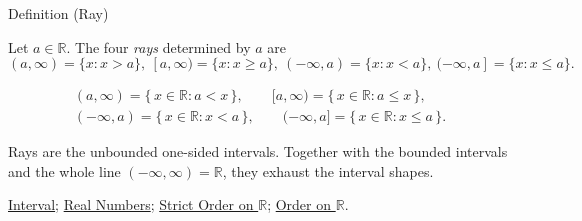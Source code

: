 
\begin{definitionbox}{Definition (Ray)}
\begin{definition}[Ray]
\label{def:ray}
Let $a\in\mathbb{R}$. The four \emph{rays} determined by $a$ are
\[
(a,\infty)=\{x:x>a\},\ [a,\infty)=\{x:x\ge a\},\ (-\infty,a)=\{x:x<a\},\ (-\infty,a]=\{x:x\le a\}.
\]
\end{definition}
\end{definitionbox}
\begin{remark*}
\[
\begin{gathered}
(a,\infty)=\{\,x\in\mathbb{R}:a<x\,\},\qquad
[a,\infty)=\{\,x\in\mathbb{R}:a\le x\,\},\\
(-\infty,a)=\{\,x\in\mathbb{R}:x<a\,\},\qquad
(-\infty,a]=\{\,x\in\mathbb{R}:x\le a\,\}.
\end{gathered}
\]
\end{remark*}
\begin{remark*}[Interpretation]
Rays are the unbounded one-sided intervals. Together with the bounded intervals and the whole line $(-\infty,\infty)=\mathbb{R}$, they exhaust the interval shapes.
\end{remark*}
\begin{dependencies}
\hyperref[def:interval]{Interval};
\hyperref[def:reals]{Real Numbers};
\hyperref[def:strict-order-on-r]{Strict Order on $\mathbb{R}$};
\hyperref[def:order-on-r]{Order on $\mathbb{R}$}.
\end{dependencies}

